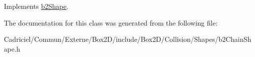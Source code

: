 Implements \hyperlink{classb2_shape_a11996b9bdcf8dca92a0c8bf484ab3f59}{b2\+Shape}.



The documentation for this class was generated from the following file\+:\begin{DoxyCompactItemize}
\item 
Cadriciel/\+Commun/\+Externe/\+Box2\+D/include/\+Box2\+D/\+Collision/\+Shapes/b2\+Chain\+Shape.\+h\end{DoxyCompactItemize}
